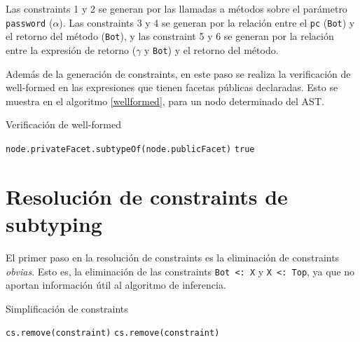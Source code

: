 Las constraints 1 y 2 se generan por las llamadas a métodos sobre el parámetro \texttt{password} ($\alpha$). Las constraints 3 y 4 se generan por la relación entre el \texttt{pc} (\texttt{Bot}) y el retorno del método (\texttt{Bot}), y las constraint 5 y 6 se generan por la relación entre la expresión de retorno ($\gamma$ y \texttt{Bot}) y el retorno del método.

Además de la generación de constraints, en este paso se realiza la verificación de well-formed en las expresiones que tienen facetas públicas declaradas. Esto se muestra en el algoritmo \ref{wellformed}, para un nodo determinado del AST.

\begin{algorithm}\captionsetup{labelsep=newline}
  \centering
  \caption{Verificación de well-formed}
  \label{wellformed}
    \begin{algorithmic}[1]
            \State \Return \texttt{node.privateFacet.subtypeOf(node.publicFacet)}
          \EndIf
          \State \Return \texttt{true}
      \EndFunction
    \end{algorithmic}
\end{algorithm}

\section{Resolución de constraints de subtyping} \label{propuestaRes}

El primer paso en la resolución de constraints es la eliminación de constraints \textit{obvias}. Esto es, la eliminación de las constraints \texttt{Bot <: X} y \texttt{X <: Top}, ya que no aportan información útil al algoritmo de inferencia.

\begin{algorithm}\captionsetup{labelsep=newline}
  \centering
  \caption{Simplificación de constraints}
  \label{pseudosimplify}
    \begin{algorithmic}[1]
              \State \texttt{cs.remove(constraint)}
              \State \texttt{cs.remove(constraint)}
            \EndIf
          \EndFor
      \EndFunction
    \end{algorithmic}
\end{algorithm}

